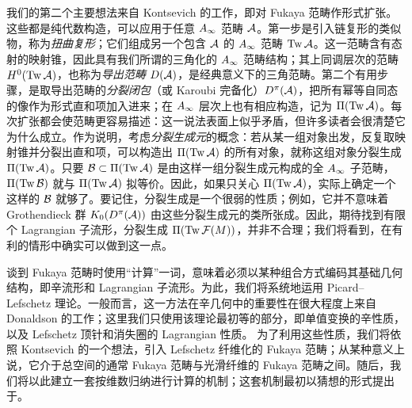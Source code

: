 我们的第二个主要想法来自 Kontsevich 的工作，即对 Fukaya 范畴作形式扩张。这些都是纯代数构造，可以应用于任意 $A_\infty$ 范畴 $\mathcal A$。第一步是引入链复形的类似物，称为\emph{扭曲复形}；它们组成另一个包含 $\mathcal A$ 的 $A_\infty$ 范畴 $\operatorname{Tw}\mathcal A$。这一范畴含有态射的映射锥，因此具有我们所谓的三角化的 $A_\infty$ 范畴结构；其上同调层次的范畴 $H^0(\operatorname{Tw}\mathcal A)$，也称为\emph{导出范畴} $D(\mathcal A)$，是经典意义下的三角范畴。第二个有用步骤，是取导出范畴的\emph{分裂闭包}（或 Karoubi 完备化）$D^{\pi}(\mathcal A)$，把所有幂等自同态的像作为形式直和项加入进来；在 $A_\infty$ 层次上也有相应构造，记为 $\Pi(\operatorname{Tw}\mathcal A)$。每次扩张都会使范畴更容易描述：这一说法表面上似乎矛盾，但许多读者会很清楚它为什么成立。作为说明，考虑\emph{分裂生成元}的概念：若从某一组对象出发，反复取映射锥并分裂出直和项，可以构造出 $\Pi(\operatorname{Tw}\mathcal A)$ 的所有对象，就称这组对象分裂生成 $\Pi(\operatorname{Tw}\mathcal A)$。只要 $\mathcal B\subset\Pi(\operatorname{Tw}\mathcal A)$ 是由这样一组分裂生成元构成的全 $A_\infty$ 子范畴，$\Pi(\operatorname{Tw}\mathcal B)$ 就与 $\Pi(\operatorname{Tw}\mathcal A)$ 拟等价。因此，如果只关心 $\Pi(\operatorname{Tw}\mathcal A)$，实际上确定一个这样的 $\mathcal B$ 就够了。要记住，分裂生成是一个很弱的性质；例如，它并不意味着 Grothendieck 群 $K_0(D^{\pi}(\mathcal A))$ 由这些分裂生成元的类所张成。因此，期待找到有限个 Lagrangian 子流形，分裂生成 $\Pi(\operatorname{Tw}\mathcal F(M))$，并非不合理；我们将看到，在有利的情形中确实可以做到这一点。

谈到 Fukaya 范畴时使用“计算”一词，意味着必须以某种组合方式编码其基础几何结构，即辛流形和 Lagrangian 子流形。为此，我们将系统地运用 Picard–Lefschetz 理论。一般而言，这一方法在辛几何中的重要性在很大程度上来自 Donaldson 的工作；这里我们只使用该理论最初等的部分，即单值变换的辛性质，以及 Lefschetz 顶针和消失圈的 Lagrangian 性质。
为了利用这些性质，我们将依照 Kontsevich 的一个想法，引入 Lefschetz 纤维化的 Fukaya 范畴；从某种意义上说，它介于总空间的通常 Fukaya 范畴与光滑纤维的 Fukaya 范畴之间。随后，我们将以此建立一套按维数归纳进行计算的机制；这套机制最初以猜想的形式提出于。

